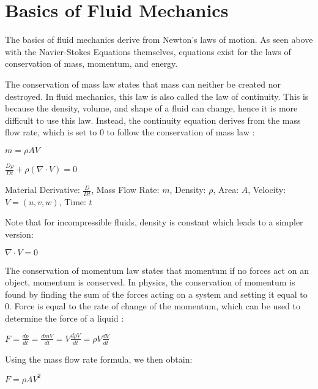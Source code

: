 \documentclass[12pt]{article}
\begin{document}
\section{Basics of Fluid Mechanics}
The basics of fluid mechanics derive from Newton's laws of motion. As seen above with the Navier-Stokes Equations themselves, equations exist for the laws of conservation of mass, momentum, and energy.

The conservation of mass law states that mass can neither be
created nor destroyed. In fluid mechanics, this law is also called the law of continuity. This is because the density, volume, and shape of a fluid can change, hence it is more difficult to use this law. Instead, the continuity equation derives from the mass flow rate, which is set to 0 to follow the conservation of mass law \cite{Navier2}:
\begin{center}$m = \rho AV$\end{center}
\begin{center}$\frac{D\rho}{Dt} + \rho(\nabla \cdot V) = 0$\end{center}
\begin{center} Material Derivative: $\frac{D}{Dt}$, Mass Flow Rate: $m$, Density: $\rho$, Area: $A$, Velocity: $V = (u,v,w)$, Time: $t$\end{center}

Note that for incompressible fluids, density is constant which leads to a simpler version:
\begin{center}$\nabla \cdot V = 0$\end{center}

The conservation of momentum law states that momentum if no forces act on an object, momentum is conserved. In physics, the conservation of momentum is found by finding the sum of the forces acting on a system and setting it equal to 0. Force is equal to the rate of change of the momentum, which can be used to determine the force of a liquid \cite{Momentum}:
\begin{center}$F = \frac{dp}{dt} = \frac{dmV}{dt} = V\frac{d\rho V}{dt}=\rho V\frac{dV}{dt}$\end{center}

Using the mass flow rate formula, we then obtain:
\begin{center}$F = \rho AV^2$\end{center}
\end{document}
